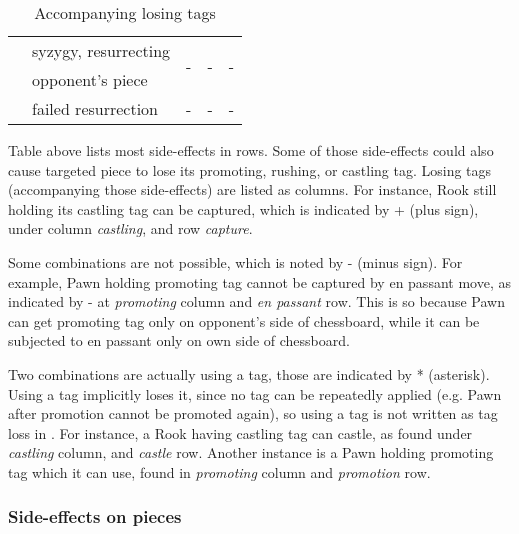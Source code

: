 \begin{table}[!h]
\begin{tabular}{ rlccc }
\multirow{2}{*}{\alg{\$\$}} & syzygy, resurrecting  & \multirow{2}{*}{-}   & \multirow{2}{*}{-}    & \multirow{2}{*}{-}    \\
                            & opponent's piece      &                      &                       &                       \\ \cmidrule{1-5}
\alg{\$\$\$}                & failed resurrection   & -                    & -                     & -                     \\
\bottomrule
\end{tabular}
\caption{Accompanying losing tags}
\label{tbl:Appendix/Summary/Accompanying-losing-tags}
\end{table}

Table above lists most side-effects in rows. Some of those side-effects could also cause
targeted piece to lose its promoting, rushing, or castling tag. Losing tags (accompanying
those side-effects) are listed as columns. For instance, Rook still holding its castling
tag can be captured, which is indicated by + (plus sign), under column \emph{castling},
and row \emph{capture}.

Some combinations are not possible, which is noted by - (minus sign). For example, Pawn
holding promoting tag cannot be captured by en passant move, as indicated by - at
\emph{promoting} column and \emph{en passant} row. This is so because Pawn can get
promoting tag only on opponent's side of chessboard, while it can be subjected to en passant
only on own side of chessboard.

Two combinations are actually using a tag, those are indicated by * (asterisk). Using a
tag implicitly loses it, since no tag can be repeatedly applied (e.g. Pawn after promotion
cannot be promoted again), so using a tag is not written as tag loss in . For
instance, a Rook having castling tag can castle, as found under \emph{castling} column,
and \emph{castle} row. Another instance is a Pawn holding promoting tag which it can use,
found in \emph{promoting} column and \emph{promotion} row.

\clearpage %

\subsubsection*{Side-effects on pieces}
\label{sec:Appendix/Summary/Side-effects/Side-effects on pieces}

